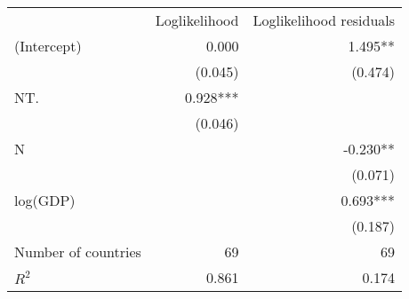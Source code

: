 \begin{tabular}{lrr}
\toprule
                    & \multicolumn{1}{c}{Loglikelihood} & \multicolumn{1}{c}{Loglikelihood residuals} \\ 
\cmidrule(lr){2-2} \cmidrule(lr){3-3} 
(Intercept)         &                             0.000 &                                     1.495** \\ 
                    &                           (0.045) &                                     (0.474) \\ 
NT.                 &                          0.928*** &                                             \\ 
                    &                           (0.046) &                                             \\ 
N                   &                                   &                                    -0.230** \\ 
                    &                                   &                                     (0.071) \\ 
log(GDP)            &                                   &                                    0.693*** \\ 
                    &                                   &                                     (0.187) \\ 
\midrule
Number of countries &                                69 &                                          69 \\ 
$R^2$               &                             0.861 &                                       0.174 \\ 
\bottomrule
\end{tabular}